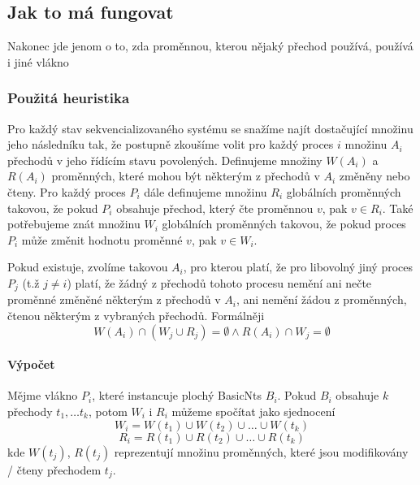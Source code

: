 \documentclass[10pt,a4paper,notitlepage]{report}
\begin{document}
\subsection{Jak to má fungovat}
Nakonec jde jenom o to, zda proměnnou, kterou nějaký přechod používá, používá i jiné vlákno

\subsubsection{Použitá heuristika}
Pro každý stav sekvencializovaného systému se snažíme najít dostačující množinu jeho následníku tak, že postupně zkoušíme volit pro každý proces $i$ množinu $A_i$ přechodů v jeho řídícím stavu povolených. Definujeme množiny $W(A_i)$ a $R(A_i)$ proměnných, které mohou být některým z přechodů v $A_i$ změněny nebo čteny. Pro každý proces $P_i$ dále definujeme množinu $R_i$ globálních proměnných takovou, že pokud $P_i$ obsahuje přechod, který čte proměnnou $v$, pak $v \in R_i$. Také potřebujeme znát množinu $W_i$ globálních proměnných takovou, že pokud proces $P_i$ může změnit hodnotu proměnné $v$, pak $v \in W_i$.

Pokud existuje, zvolíme takovou $A_i$, pro kterou platí, že pro libovolný jiný proces $P_j$ (t.ž $j \neq i$) platí, že žádný z přechodů tohoto procesu nemění ani nečte proměnné změněné některým z přechodů v $A_i$, ani  nemění žádou z proměnných, čtenou některým z vybraných přechodů. Formálněji
\begin{equation}
W(A_i) \cap (W_j \cup R_j) = \emptyset \land R(A_i) \cap W_j = \emptyset
\end{equation}


\paragraph{Výpočet}
Mějme vlákno $P_i$, které instancuje plochý BasicNts $B_i$. Pokud $B_i$ obsahuje $k$ přechody $t_1, \ldots t_k$, potom $W_i$ i $R_i$ můžeme spočítat jako sjednocení
\begin{equation}
W_i = W(t_1) \cup W(t_2) \cup \ldots \cup W(t_k)
\end{equation}
\begin{equation}
R_i = R(t_1) \cup R(t_2) \cup \ldots \cup R(t_k)
\end{equation}
kde $W(t_j)$, $R(t_j)$ reprezentují množinu proměnných, které jsou modifikovány / čteny přechodem $t_j$.
\end{document}
